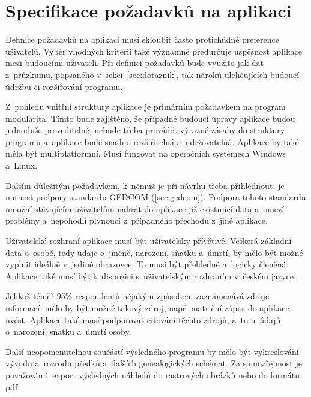 	\section{Specifikace požadavků na aplikaci}
	Definice požadavků na aplikaci musí skloubit často protichůdné preference uživatelů. Výběr vhodných kritérií také významně předurčuje úspěšnost aplikace mezi budoucími uživateli. Při definici požadavků bude využito jak dat z~průzkumu, popsaného v~sekci~\ref{sec:dotaznik}, tak nároků ulehčujících budoucí údržbu či rozšiřování programu.\par
	Z~pohledu vnitřní struktury aplikace je primárním požadavkem na program modularita. Tímto bude zajištěno, že případné budoucí úpravy aplikace budou jednoduše proveditelné, nebude třeba provádět výrazné zásahy do struktury programu a~aplikace bude snadno rozšiřitelná a~udržovatelná. Aplikace by také měla být multiplatformní. Musí fungovat na operačních systémech Windows a~Linux.\par
	Dalším důležitým požadavkem, k~němuž je při návrhu třeba přihlédnout, je nutnost podpory standardu GEDCOM (\ref{sec:gedcom}). Podpora tohoto standardu umožní stávajícím uživatelům nahrát do aplikace již existující data a~omezí problémy a~nepohodlí plynoucí z~případného přechodu z~jiné aplikace.\par
	Uživatelské rozhraní aplikace musí být uživatelsky přívětivé. Veškerá základní data o~osobě, tedy údaje o~jméně, narození, sňatku a~úmrtí, by mělo být možné vyplnit ideálně v~jediné obrazovce. Ta musí být přehledně a~logicky členěná. Aplikace také musí být k~dispozici s~uživatelským rozhraním v~českém jazyce.\par
	Jelikož téměř 95\% respondentů nějakým způsobem zaznamenává zdroje informací, mělo by být možné takový zdroj, např. matriční zápis, do aplikace uvést. Aplikace také musí podporovat citování těchto zdrojů, a~to u~údajů o~narození, sňatku a~úmrtí osoby. \par
	Další neopomenutelnou součástí výsledného programu by mělo být vykreslování vývodu a~rozrodu předků a~dalších genealogických schémat. Za samozřejmost je považován i~export výsledných náhledů do rastrových obrázků nebo do formátu pdf. \par
	
	
	
